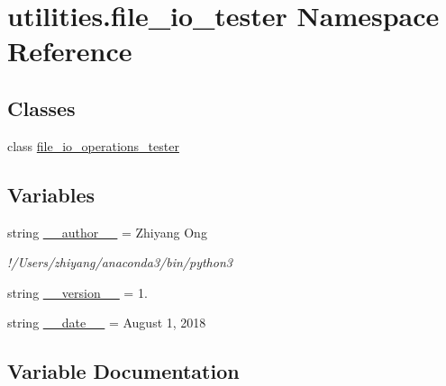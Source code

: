 \hypertarget{namespaceutilities_1_1file__io__tester}{}\section{utilities.\+file\+\_\+io\+\_\+tester Namespace Reference}
\label{namespaceutilities_1_1file__io__tester}
\subsection*{Classes}
\begin{DoxyCompactItemize}
\item 
class \hyperlink{classutilities_1_1file__io__tester_1_1file__io__operations__tester}{file\+\_\+io\+\_\+operations\+\_\+tester}
\end{DoxyCompactItemize}
\subsection*{Variables}
\begin{DoxyCompactItemize}
\item 
string \hyperlink{namespaceutilities_1_1file__io__tester_a1e98e62ebd56ece4ec2a1b305f33aa72}{\+\_\+\+\_\+author\+\_\+\+\_\+} = \textquotesingle{}Zhiyang Ong\textquotesingle{}
\begin{DoxyCompactList}\small\item\em !/\+Users/zhiyang/anaconda3/bin/python3 \end{DoxyCompactList}\item 
string \hyperlink{namespaceutilities_1_1file__io__tester_a18133e21b0a493dfcb0dcd31bd81a40e}{\+\_\+\+\_\+version\+\_\+\+\_\+} = \textquotesingle{}1.\textquotesingle{}
\item 
string \hyperlink{namespaceutilities_1_1file__io__tester_aff68b27f06e5ed552222d5e8ef71af1b}{\+\_\+\+\_\+date\+\_\+\+\_\+} = \textquotesingle{}August 1, 2018\textquotesingle{}
\end{DoxyCompactItemize}


\subsection{Variable Documentation}
\hypertarget{namespaceutilities_1_1file__io__tester_a1e98e62ebd56ece4ec2a1b305f33aa72}{}
